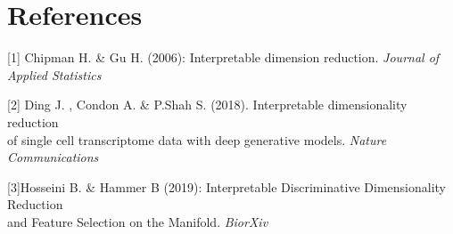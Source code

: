 \documentclass{article}
\begin{document}
\section{References}\label{sec_ref}

[1] Chipman H. \& Gu H. (2006): Interpretable dimension reduction. 
{\it Journal of Applied Statistics}

[2] Ding J. , Condon A. \& P.Shah S. (2018). Interpretable dimensionality reduction \\ of single cell transcriptome data with deep generative models. 
{\it Nature Communications}

[3]Hosseini B. \& Hammer B (2019): Interpretable Discriminative Dimensionality Reduction \\ and Feature Selection on the Manifold.
{\it BiorXiv}
\end{document}
